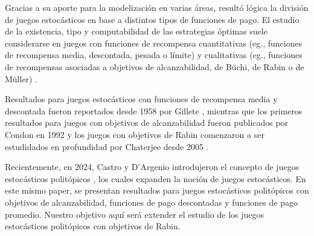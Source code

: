 Gracias a su aporte para la modelización en varias áreas, resultó lógica la
división de juegos estocásticos en base a distintos tipos de funciones de pago.
El estudio de la existencia, tipo y computabilidad de las estrategias óptimas
suele considerarse en juegos con funciones de recompensa cuantitativas (eg.,
funciones de recompensa media, descontada, pesada o límite) y cualitativas
(eg., funciones de recompensas asociadas a objetivos de alcanzabilidad, de
Büchi, de Rabin o de Müller) \cite{Chatterjee2007,Kučera2011,Chatterjee1}.

Resultados para juegos estocásticos con funciones de recompensa media y
descontada fueron reportados desde 1958 por Gillete \cite{Gillette1958},
mientras que los primeros resultados para juegos con objetivos de
alcanzabilidad fueron publicados por Condon en 1992 \cite{CONDON1992} y los
juegos con objetivos de Rabin comenzaron a ser estudidados en profundidad por
Chaterjee desde 2005 \cite{ComplexityRabin,Chatterjee2007,Chatterjee1}.

Recientemente, en 2024, Castro y D'Argenio introdujeron el concepto de juegos
estocásticos politópicos \cite{Polytopal}, los cuales expanden la noción de
juegos estocásticos.
En este mismo paper, se presentan resultados para juegos estocásticos
politópicos con objetivos de alcanzabilidad, funciones de pago descontadas y
funciones de pago promedio. Nuestro objetivo aquí será extender el estudio de
los juegos estocásticos politópicos con objetivos de Rabin.

